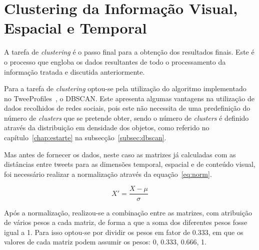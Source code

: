 \section{Clustering da Informação Visual, Espacial e Temporal} \label{sec:finalclustering}

A tarefa de \textit{clustering} é o passo final para a obtenção dos resultados finais. Este é o processo que engloba os dados resultantes de todo o processamento da informação tratada e discutida anteriormente.

Para a tarefa de \textit{clustering} optou-se pela utilização do algoritmo implementado no TweeProfiles~\cite{Cunha2013}, o DBSCAN. Este apresenta algumas vantagens na utilização de dados recolhidos de redes sociais, pois este não necessita de uma predefinição do número de \textit{clusters} que se pretende obter, sendo o número de \textit{clusters} é definido através da distribuição em densidade dos objetos, como referido no capítulo~\ref{chap:estarte} na subsecção~\ref{subsec:dbscan}.

Mas antes de fornecer os dados, neste caso as matrizes já calculadas com as distâncias entre tweets para as dimensões temporal, espacial e de conteúdo visual, foi necessário realizar a normalização através da equação~\ref{eq:norm}.

\begin{equation}
X' = \frac{X - \mu }{\sigma }
\label{eq:norm}
\end{equation}

Após a normalização, realizou-se a combinação entre as matrizes, com atribuição de vários pesos a cada matriz, de forma a que a soma dos diferentes pesos fosse igual a 1. Para isso optou-se por dividir os pesos em fator de 0.333, em que os valores de cada matriz podem assumir os pesos: 0, 0.333, 0.666, 1.

%

